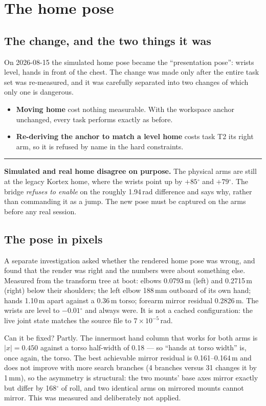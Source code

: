 \documentclass[11pt,a4paper,oneside]{report}
\newcommand{\dg}{$^{\circ}$}
\newcommand{\keyfact}[1]{%
  \par\vspace{7pt}\noindent
  \hspace*{0pt}\textcolor{srlblue}{\rule{2.5pt}{\dimexpr\baselineskip\relax}}%
  \hspace{9pt}%
  \begin{minipage}[t]{\dimexpr\textwidth-14pt\relax}
  \small #1
  \end{minipage}\par\vspace{7pt}}
\begin{document}
\section{The home pose}

\subsection{The change, and the two things it was}

On 2026-08-15 the simulated home pose became the ``presentation pose'': wrists
level, hands in front of the chest. The change was made only after the entire
task set was re-measured, and it was carefully separated into two changes of
which only one is dangerous.

\begin{itemize}
\item \textbf{Moving home} cost nothing measurable. With the workspace anchor
      unchanged, every task performs exactly as before.
\item \textbf{Re-deriving the anchor to match a level home} costs task T2 its
      right arm, so it is refused by name in the hard constraints.
\end{itemize}

\keyfact{\textbf{Simulated and real home disagree on purpose.} The physical
arms are still at the legacy Kortex home, where the wrists point up by
$+85$\dg{} and $+79$\dg. The bridge \emph{refuses to enable} on the roughly
1.94\,rad difference and says why, rather than commanding it as a jump. The new
pose must be captured on the arms before any real session.}

\subsection{The pose in pixels}

A separate investigation asked whether the rendered home pose was wrong, and
found that the render was right and the numbers were about something else.
Measured from the transform tree at boot: elbows 0.0793\,m (left) and 0.2715\,m
(right) below their shoulders; the left elbow 188\,mm outboard of its own hand;
hands 1.10\,m apart against a 0.36\,m torso; forearm mirror residual 0.2826\,m.
The wrists are level to $-0.01$\dg{} and always were. It is not a cached
configuration: the live joint state matches the source file to $7\times10^{-5}$\,rad.

Can it be fixed? Partly. The innermost hand column that works for both arms is
$|x| = 0.450$ against a torso half-width of 0.18 --- so ``hands at torso width''
is, once again, the torso. The best achievable mirror residual is
0.161--0.164\,m and does not improve with more search branches (4 branches
versus 31 changes it by 1\,mm), so the asymmetry is structural: the two mounts'
base axes mirror exactly but differ by 168\dg{} of roll, and two identical arms
on mirrored mounts cannot mirror. This was measured and deliberately not
applied.
\end{document}
